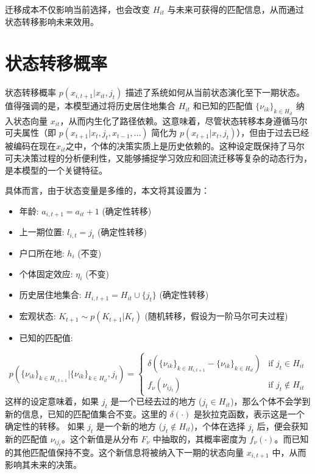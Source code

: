 \documentclass[master, final]{zufe-thesis}
\begin{document}
迁移成本不仅影响当前选择，也会改变 $H_{it}$ 与未来可获得的匹配信息，从而通过状态转移影响未来效用。

\section{状态转移概率}



状态转移概率 $p(x_{i,t+1}|x_{it}, j_t)$ 描述了系统如何从当前状态演化至下一期状态。值得强调的是，本模型通过将历史居住地集合 $H_{it}$ 和已知的匹配值 $\{\nu_{ik}\}_{k\in H_{it}}$ 纳入状态向量 $x_{it}$，从而内生化了路径依赖。这意味着，尽管状态转移本身遵循马尔可夫属性（即 $p(x_{t+1}|x_t, j_t, x_{t-1}, \dots)$ 简化为 $p(x_{t+1}|x_t, j_t)$），但由于过去已经被编码在现在$x_{it}$之中，个体的决策实质上是历史依赖的。这种设定既保持了马尔可夫决策过程的分析便利性，又能够捕捉学习效应和回流迁移等复杂的动态行为，是本模型的一个关键特征。


具体而言，由于状态变量是多维的，本文将其设置为：

\begin{itemize}
    \item 年龄: $a_{i,t+1} = a_{it} + 1$ (确定性转移)
    \item 上一期位置: $l_{i,t} = j_t$ (确定性转移)
    \item 户口所在地: $h_i$ (不变)
    \item 个体固定效应: $\eta_i$ (不变)
    \item 历史居住地集合: $H_{i,t+1} = H_{it} \cup \{j_t\}$ (确定性转移)
    \item 宏观状态: $K_{t+1} \sim p(K_{t+1}|K_t)$ (随机转移，假设为一阶马尔可夫过程)
    \item 已知的匹配值: 
\end{itemize}  

$$ p(\{\nu_{ik}\}_{k \in H_{i,t+1}} | \{\nu_{ik}\}_{k \in H_{it}}, j_t) = \begin{cases} \delta(\{\nu_{ik}\}_{k \in H_{i,t+1}} - \{\nu_{ik}\}_{k \in H_{it}}) & \text{if } j_t \in H_{it} \\ f_\nu(\nu_{ij_t}) & \text{if } j_t \notin H_{it} \end{cases} $$
这样的设定意味着，如果 $j_t$ 是一个已经去过的地方 ($j_t \in H_{it}$)，那么个体不会学到新的信息，已知的匹配值集合不变。这里的 $\delta(\cdot)$ 是狄拉克函数，表示这是一个确定性的转移。
如果 $j_t$ 是一个新的地方 ($j_t \notin H_{it}$)，个体在选择 $j_t$ 后，便会获知新的匹配值 $\nu_{ij_t}$。这个新值是从分布 $F_\nu$ 中抽取的，其概率密度为 $f_\nu(\cdot)$。而已知的其他匹配值保持不变。这个新信息将被纳入下一期的状态向量 $x_{i,t+1}$ 中，从而影响其未来的决策。
\end{document}
